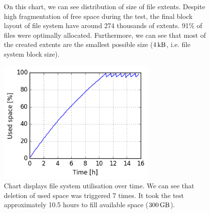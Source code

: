 \documentclass[
  color, %
  table, %
  lof,   %
  lot,   %
]{fithesis3}
\begin{document}
\begin{figure}[h]
    \centering
    \caption[Size distribution of file extents of ext4 during testing of high utilisation of HDD]{On this chart, we can see distribution of size of file extents. Despite high fragmentation of free space during the test, the final block layout of file system have around 274 thousands of extents. 91\% of files were optimally allocated. Furthermore, we can see that most of the created extents are the smallest possible size ($\SI{4}{\kilo\byte}$, i.e. file system block size).}
    \label{fig:used99_ext4}
\end{figure}

\begin{figure}[!h]
    \begin{minipage}{\textwidth}
        \centering
        \includegraphics[width=0.7\textwidth]{../charts/HDD_ext4/usage.png}
        \caption[Usage of available space of ext4 during testing of high utilisation of HDD]{Chart displays file system utilisation over time. We can see that deletion of used space was triggered 7 times. It took the test approximately 10.5 hours to fill available space ($\SI{300}{\giga\byte}$).}
\label{fig:usage99_ext4}
    \end{minipage}
\end{figure}
\end{document}
